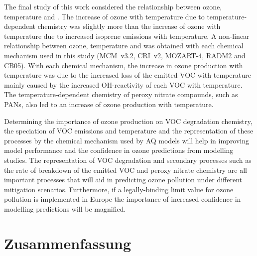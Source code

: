 The final study of this work considered the relationship between ozone, temperature and .
The increase of ozone with temperature due to temperature-dependent chemistry was slightly more than the increase of ozone with temperature due to increased isoprene emissions with temperature.
A non-linear relationship between ozone, temperature and  was obtained with each chemical mechanism used in this study (MCM~v3.2, CRI~v2, MOZART-4, RADM2 and CB05).
With each chemical mechanism, the increase in ozone production with temperature was due to the increased loss of the emitted VOC with temperature mainly caused by the increased OH-reactivity of each VOC with temperature.
The temperature-dependent chemistry of peroxy nitrate compounds, such as PANs, also led to an increase of ozone production with temperature.

Determining the importance of ozone production on VOC degradation chemistry, the speciation of VOC emissions and temperature and the representation of these processes by the chemical mechanism used by AQ models will help in improving model performance and the confidence in ozone predictions from modelling studies.
The representation of VOC degradation and secondary processes such as the rate of breakdown of the emitted VOC and peroxy nitrate chemistry are all important processes that will aid in predicting ozone pollution under different mitigation scenarios.
Furthermore, if a legally-binding limit value for ozone pollution is implemented in Europe the importance of increased confidence in modelling predictions will be magnified.

\section{Zusammenfassung}
